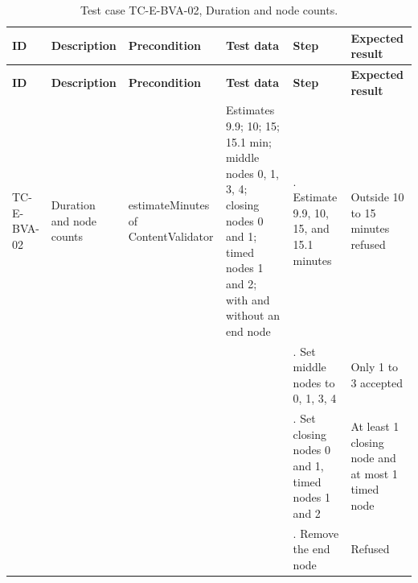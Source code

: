 {\footnotesize{}\renewcommand{\arraystretch}{1.1}
\begin{longtable}{|>{\raggedright\arraybackslash}p{}|>{\raggedright\arraybackslash}p{}|>{\raggedright\arraybackslash}p{}|>{\raggedright\arraybackslash}p{}|>{\raggedright\arraybackslash}p{}|>{\raggedright\arraybackslash}p{}|}
\caption{Test case TC-\allowbreak{}E-\allowbreak{}BVA-\allowbreak{}02, Duration and node counts.} \\
\hline
\textbf{ID} & \textbf{Description} & \textbf{Precondition} & \textbf{Test data} & \textbf{Step} & \textbf{Expected result} \\ \hline
\endfirsthead
\hline
\textbf{ID} & \textbf{Description} & \textbf{Precondition} & \textbf{Test data} & \textbf{Step} & \textbf{Expected result} \\ \hline
\endhead
TC-E-BVA-02 & Duration and node counts & estimateMinutes of ContentValidator & Estimates 9.9; 10; 15; 15.1 min; middle nodes 0, 1, 3, 4; closing nodes 0 and 1; timed nodes 1 and 2; with and without an end node & 1. Estimate 9.9, 10, 15, and 15.1 minutes & Outside 10 to 15 minutes refused \\ \cline{5-6}
 &  &  &  & 2. Set middle nodes to 0, 1, 3, 4 & Only 1 to 3 accepted \\ \cline{5-6}
 &  &  &  & 3. Set closing nodes 0 and 1, timed nodes 1 and 2 & At least 1 closing node and at most 1 timed node \\ \cline{5-6}
 &  &  &  & 4. Remove the end node & Refused \\ \hline
\end{longtable}
}

